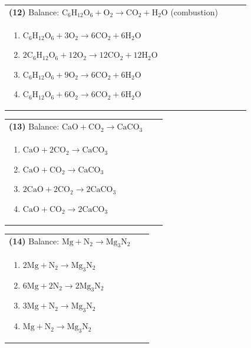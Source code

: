 \documentclass{article}
\begin{document}
\vspace{0.2cm}
\noindent \begin{tabular}{|p{0.9\linewidth}|}
\hline
\vspace{0.2cm}
\textbf{(12)} Balance: \(\mathrm{C_6H_{12}O_6 + O_2 \rightarrow CO_2 + H_2O}\) (combustion)\\
\begin{minipage}[t]{0.85\linewidth}
\begin{enumerate}[label=\alph*.]
   \item \(\mathrm{C_6H_{12}O_6 + 3O_2 \rightarrow 6CO_2 + 6H_2O}\)
   \item \(\mathrm{2C_6H_{12}O_6 + 12O_2 \rightarrow 12CO_2 + 12H_2O}\)
   \item \(\mathrm{C_6H_{12}O_6 + 9O_2 \rightarrow 6CO_2 + 6H_2O}\)
   \item \(\mathrm{C_6H_{12}O_6 + 6O_2 \rightarrow 6CO_2 + 6H_2O}\)
\end{enumerate}
\end{minipage}\\
\hline
\end{tabular}
\newpage

\vspace{0.2cm}
\noindent \begin{tabular}{|p{0.9\linewidth}|}
\hline
\vspace{0.2cm}
\textbf{(13)} Balance: \(\mathrm{CaO + CO_2 \rightarrow CaCO_3}\)\\
\begin{minipage}[t]{0.85\linewidth}
\begin{enumerate}[label=\alph*.]
   \item \(\mathrm{CaO + 2CO_2 \rightarrow CaCO_3}\)
   \item \(\mathrm{CaO + CO_2 \rightarrow CaCO_3}\)
   \item \(\mathrm{2CaO + 2CO_2 \rightarrow 2CaCO_3}\)
   \item \(\mathrm{CaO + CO_2 \rightarrow 2CaCO_3}\)
\end{enumerate}
\end{minipage}\\
\hline
\end{tabular}

\vspace{0.2cm}
\noindent \begin{tabular}{|p{0.9\linewidth}|}
\hline
\vspace{0.2cm}
\textbf{(14)} Balance: \(\mathrm{Mg + N_2 \rightarrow Mg_3N_2}\)\\
\begin{minipage}[t]{0.85\linewidth}
\begin{enumerate}[label=\alph*.]
   \item \(\mathrm{2Mg + N_2 \rightarrow Mg_3N_2}\)
   \item \(\mathrm{6Mg + 2N_2 \rightarrow 2Mg_3N_2}\)
   \item \(\mathrm{3Mg + N_2 \rightarrow Mg_3N_2}\)
   \item \(\mathrm{Mg + N_2 \rightarrow Mg_3N_2}\)
\end{enumerate}
\end{minipage}\\
\hline
\end{tabular}
\end{document}
